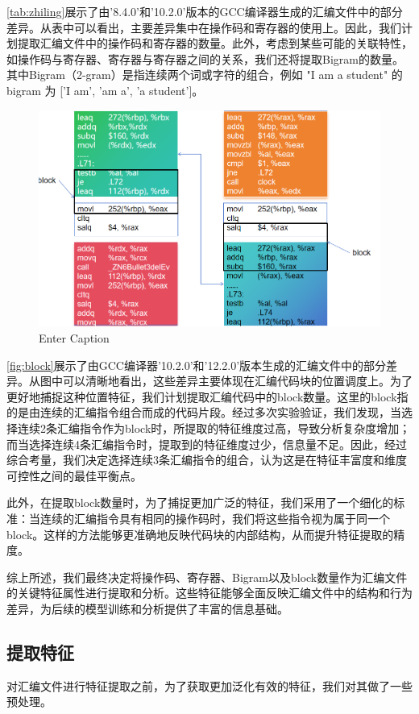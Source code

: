 \autoref{tab:zhiling}展示了由'8.4.0'和'10.2.0'版本的GCC编译器生成的汇编文件中的部分差异。从表中可以看出，主要差异集中在操作码和寄存器的使用上。因此，我们计划提取汇编文件中的操作码和寄存器的数量。此外，考虑到某些可能的关联特性，如操作码与寄存器、寄存器与寄存器之间的关系，我们还将提取Bigram的数量。其中Bigram（2-gram）是指连续两个词或字符的组合，例如 "I am a student" 的 bigram 为 ['I am', 'am a', 'a student']。
\begin{figure}[H]
    \centering
    \includegraphics[width=0.75\linewidth]{figures/block.png}
    \caption{Enter Caption}
    \label{fig:block}
\end{figure}


  \autoref{fig:block}展示了由GCC编译器'10.2.0'和'12.2.0'版本生成的汇编文件中的部分差异。从图中可以清晰地看出，这些差异主要体现在汇编代码块的位置调度上。为了更好地捕捉这种位置特征，我们计划提取汇编代码中的block数量。这里的block指的是由连续的汇编指令组合而成的代码片段。经过多次实验验证，我们发现，当选择连续2条汇编指令作为block时，所提取的特征维度过高，导致分析复杂度增加；而当选择连续4条汇编指令时，提取到的特征维度过少，信息量不足。因此，经过综合考量，我们决定选择连续3条汇编指令的组合，认为这是在特征丰富度和维度可控性之间的最佳平衡点。

此外，在提取block数量时，为了捕捉更加广泛的特征，我们采用了一个细化的标准：当连续的汇编指令具有相同的操作码时，我们将这些指令视为属于同一个block。这样的方法能够更准确地反映代码块的内部结构，从而提升特征提取的精度。

  综上所述，我们最终决定将操作码、寄存器、Bigram以及block数量作为汇编文件的关键特征属性进行提取和分析。这些特征能够全面反映汇编文件中的结构和行为差异，为后续的模型训练和分析提供了丰富的信息基础。

  \subsection{提取特征}
  对汇编文件进行特征提取之前，为了获取更加泛化有效的特征，我们对其做了一些预处理。
  
